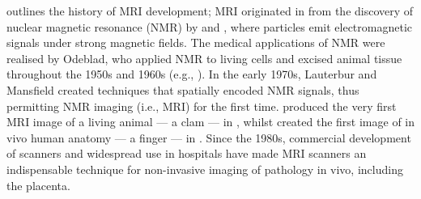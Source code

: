         \citeauthor{rinck2008short} \cite{rinck2008short} outlines the history of MRI development; MRI originated in \citeyear{blochNuclearInduction1946} from the discovery of nuclear magnetic resonance (NMR) by \citeauthor{blochNuclearInduction1946} \cite{blochNuclearInduction1946} and \citeauthor*{purcellResonanceAbsorptionNuclear1946} \cite{purcellResonanceAbsorptionNuclear1946}, where particles emit electromagnetic signals under strong magnetic fields. The medical applications of NMR were realised by Odeblad, who applied NMR to living cells and excised animal tissue throughout the 1950s and 1960s (e.g., \cite{odebladPreliminaryObservationsProton1955,odebladProtonMagneticResonance1956,odebladFunctionalStructureHuman1968}). In the early 1970s, Lauterbur and Mansfield created techniques that spatially encoded NMR signals, thus permitting NMR imaging (i.e., MRI) for the first time. \citeauthor*{lauterburMagneticResonanceZeugmatography1974} \cite{lauterburMagneticResonanceZeugmatography1974} produced the very first MRI image of a living animal --- a clam --- in \citeyear{lauterburMagneticResonanceZeugmatography1974}, whilst \citeauthor*{mansfieldMedicalImagingNMR1977} \cite{mansfieldMedicalImagingNMR1977} created the first image of in vivo human anatomy --- a finger --- in \citeyear{mansfieldMedicalImagingNMR1977}. Since the 1980s, commercial development of scanners and widespread use in hospitals have made MRI scanners an indispensable technique for non-invasive imaging of pathology in vivo, including the placenta.

